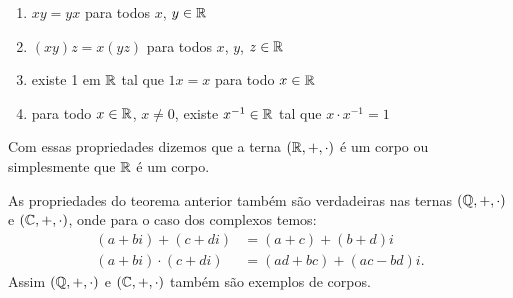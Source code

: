 \documentclass{beamer}
\begin{document}
    \begin{frame}
      \begin{teorema}
        \begin{enumerate}[label={\roman*})]
          \conti
          \item $xy = yx$ para todos $x$, $y \in \mathbb{R}$
          
          \item $(xy)z = x(yz)$ para todos $x$, $y$, $z \in \mathbb{R}$

          \item existe 1 em $\mathbb{R}$ tal que $1x = x$ para todo $x \in \mathbb{R}$

          \item para todo $x \in \mathbb{R}$, $x \ne 0$, existe $x^{-1} \in \mathbb{R}$ tal
            que $x\cdot x^{-1} = 1$
        \end{enumerate}
        Com essas propriedades dizemos que a terna $(\mathbb{R}, +, \cdot)$ é um
        corpo ou simplesmente que $\mathbb{R}$ é um corpo.
      \end{teorema}
      
      \begin{observacao}
        As propriedades do teorema anterior também são verdadeiras nas ternas
        $(\mathbb{Q}, +, \cdot)$ e $(\mathbb{C}, +, \cdot)$, onde para o caso dos
        complexos temos:
        \begin{align*}
          (a + bi) + (c + di) &= (a + c) + (b + d)i\\
          (a + bi)\cdot(c + di) &= (ad + bc) + (ac - bd)i.
        \end{align*}
        Assim $(\mathbb{Q}, +, \cdot)$ e $(\mathbb{C}, +, \cdot)$ também são exemplos de
        corpos.
      \end{observacao}
    \end{frame}
\end{document}
